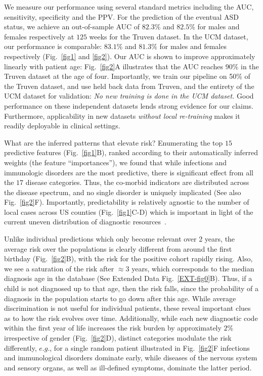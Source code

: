 \documentclass[3p,super,numbers,sort&compress,preprint,10pt]{elsarticle}
\def\treatment{positive\xspace}
\begin{document}
We measure our performance using several standard metrics including the AUC, sensitivity, specificity and the PPV. For the prediction of the eventual ASD  status, we achieve an out-of-sample AUC of $82.3\%$ and  $82.5\%$ for males and females respectively at $125$ weeks for the Truven dataset. In the UCM dataset, our performance is comparable: $83.1\%$ and $81.3\%$ for males and females respectively (Fig.~\ref{fig1} and \ref{fig2}).  Our AUC is shown to improve approximately  linearly  with patient age: Fig.~\ref{fig2}A illustrates that the  AUC  reaches 90\%  in the Truven dataset at the age of four. Importantly, we train  our  pipeline on 50\% of the Truven dataset, and use held back data from Truven, and the entirety of the UCM dataset for validation: \textit{No new training is done in the UCM dataset.} Good  performance on these independent datasets lends strong evidence for our claims. Furthermore, applicability in new datasets \textit{without local re-training} makes it readily  deployable in clinical settings.


What are the inferred patterns that  elevate risk? %
Enumerating the top $15$ predictive features (Fig.~\ref{fig1}B), ranked  according to their automatically inferred weights  (the feature ``importances''), we found that while infections and immunologic disorders are the most predictive, there is significant effect from all the $17$ disease categories. Thus, the  co-morbid indicators are  distributed across the disease spectrum, and no single  disorder is uniquely implicated (See also Fig.~\ref{fig2}F). Importantly, predictability is relatively agnostic to the number of local cases across US counties (Fig.~\ref{fig1}C-D) which is important in light of the current uneven distribution of  diagnostic resources~\cite{gordon2016whittling,althouse2006pediatric}. 

Unlike individual predictions which only become relevant over 2 years, the average risk over the populations is clearly different  from around the  first birthday (Fig.~\ref{fig2}B), with the risk for the  \treatment cohort rapidly rising.
%
Also, we see a saturation of the risk after $\approx 3$ years, which corresponds to the median diagnosis age in the database (See Extended Data Fig.~\ref{EXT-fig0}B). Thus, if a child is not diagnosed up to that age, then the  risk  falls, since the probability of a diagnosis in the population starts to go down after this age. While average discrimination is not useful for individual patients, these reveal important clues as to how the  risk evolves over time. Additionally, while  each  new diagnostic code within the first year of life  increases the risk burden by approximately $2\%$ irrespective of gender (Fig.~\ref{fig2}D), distinct  categories modulate the risk differently, $e.g.$, for a single random patient  illustrated in Fig.~\ref{fig2}F infections and immunological disorders dominate early, while  diseases of the nervous system and sensory organs, as well as ill-defined symptoms,  dominate the latter period.
\end{document}
